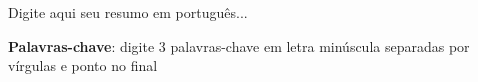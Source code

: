 \setlength{\absparsep}{18pt} %
\begin{resumo}
 
Digite aqui seu resumo em português...

 \textbf{Palavras-chave}: digite 3 palavras-chave em letra minúscula separadas por vírgulas e ponto no final
\end{resumo}